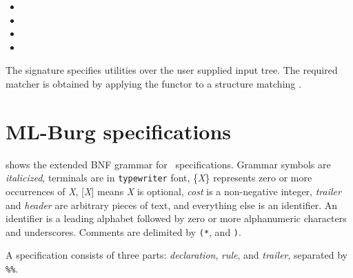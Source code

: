 \documentclass[11pt]{article}
\begin{document}
\begin{itemize}
	\item{}
	\item{}
	\item{}
	\item{}
\end{itemize}

The signature  specifies utilities over the 
user supplied input
tree. The required matcher is obtained by applying the functor
 to a structure matching .



		\section{ML-Burg specifications}

 shows the extended BNF grammar for 
\mlburg\ specifications. Grammar symbols are {\it italicized}, terminals
are in {\tt typewriter} font, \{{\it X}\} represents zero or more
occurrences of {\it X}, {\rm [}{\it X}{\rm ]} means {\it X} is optional, 
{\sl cost} is a non-negative integer, {\sl trailer} and {\sl header}
are arbitrary pieces of text, and everything else is an identifier.
An identifier is a leading alphabet followed by zero or more
alphanumeric characters and underscores. Comments are delimited
by {\tt (*}, and {\tt *)}. 

A specification consists of three parts: {\it declaration}, {\it rule},
and {\sl trailer}, separated by \verb|%%|.
\end{document}
